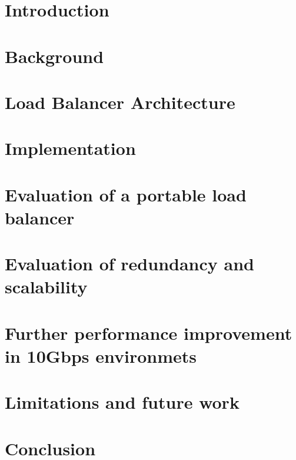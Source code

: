 
\graphicspath{{Manuscript/}}

\chapter{Introduction}\label{chapter:introduction}


\chapter{Background}\label{chapter:background}



\chapter{Load Balancer Architecture}\label{chapter:architecture}


\chapter{Implementation}\label{chapter:implemetation}


\chapter{Evaluation of a portable load balancer}\label{chapter:portablelb}


\chapter{Evaluation of redundancy and scalability}\label{chapter:redundancy}


\chapter{Further performance improvement in 10Gbps environmets}\label{chapter:performance}


\chapter{Limitations and future work}\label{chapter:futurework}


\chapter{Conclusion}\label{chapter:conclusion}




